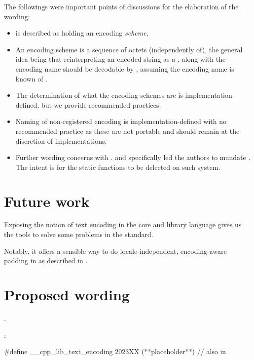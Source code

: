 \documentclass{wg21}
\begin{document}
The followings were important points of discussions for the elaboration of the wording:
\begin{itemize}
\item {} is described as holding an encoding \emph{scheme},
\item An encoding scheme is a sequence of octets (independently of), the general idea being that reinterpreting an encoded string as a , along with the encoding name should be decodable by , assuming the encoding name is known of .
\item The determination of what the encoding schemes are is implementation-defined, but we provide recommended practices.
\item Naming of non-registered encoding is implementation-defined with no recommended practice as these are not portable and should remain at the discretion of implementations.
\item Further wording concerns with . and specifically  led the authors to mandate .
The intent is for the static functions to be delected on such system.
\end{itemize}


\section{Future work}

Exposing the notion of text encoding in the core and library language gives us the tools to solve some problems in the standard.

Notably, it offers a sensible way to do locale-independent, encoding-aware padding in  as described in \cite{P1868}.

\section{Proposed wording}

.

:

\begin{codeblock}
#define __cpp_lib_text_encoding 2023XX (**placeholder**) // also in 
\end{codeblock}
\end{document}
